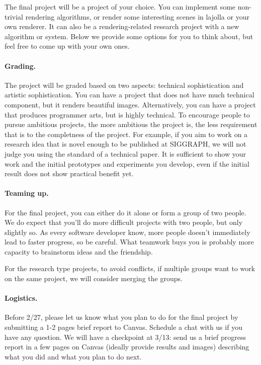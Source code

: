 




The final project will be a project of your choice. You can implement some non-trivial rendering algorithms, or render some interesting scenes in lajolla or your own renderer. It can also be a rendering-related research project with a new algorithm or system. 
Below we provide some options for you to think about, but feel free to come up with your own ones.

\paragraph{Grading.} 
The project will be graded based on two aspects: technical sophistication and artistic sophistication.
You can have a project that does not have much technical component, but it renders beautiful images.
Alternatively, you can have a project that produces programmer arts, but is highly technical. 
To encourage people to pursue ambitious projects, the more ambitious the project is, the less requirement that is to the completness of the project. 
For example, if you aim to work on a research idea that is novel enough to be published at SIGGRAPH, we will not judge you using the standard of a technical paper.
It is sufficient to show your work and the initial prototypes and experiments you develop, even if the initial result does not show practical benefit yet.

\paragraph{Teaming up.}
For the final project, you can either do it alone or form a group of two people. We do expect that you'll do more difficult projects with two people, but only slightly so. As every software developer know, more people doesn't immediately lead to faster progress, so be careful. What teamwork buys you is probably more capacity to brainstorm ideas and the friendship.

For the research type projects, to avoid conflicts, if multiple groups want to work on the same project, we will consider merging the groups. 

\paragraph{Logistics.}
Before 2/27, please let us know what you plan to do for the final project by submitting a 1-2 pages brief report to Canvas.
Schedule a chat with us if you have any question. 
We will have a checkpoint at 3/13: send us a brief progress report in a few pages on Canvas (ideally provide results and images) describing what you did and what you plan to do next.

